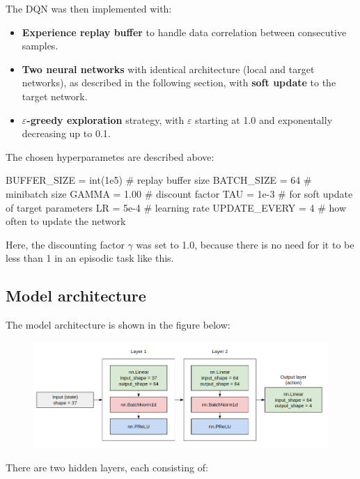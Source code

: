\documentclass{article}
\begin{document}
The DQN was then implemented with:

\begin{itemize}
    \item \textbf{Experience replay buffer} to handle data correlation between consecutive samples.
    \item \textbf{Two neural networks} with identical architecture (local and target networks), as described in the following section, with \textbf{soft update} to the target network.
    \item \textbf{$\varepsilon$-greedy exploration} strategy, with $\varepsilon$ starting at 1.0 and exponentally decreasing up to 0.1.
\end{itemize}

The chosen hyperparametes are described above:

\begin{code}[Python]
BUFFER_SIZE = int(1e5)  # replay buffer size
BATCH_SIZE = 64         # minibatch size
GAMMA = 1.00            # discount factor
TAU = 1e-3              # for soft update of target parameters
LR = 5e-4               # learning rate
UPDATE_EVERY = 4        # how often to update the network
\end{code}

Here, the discounting factor $\gamma$ was set to 1.0, because there is no need for it to be less than 1 in an episodic task like this.

\subsection{Model architecture}

The model architecture is shown in the figure below:

\begin{figure}[H]
\centering
\includegraphics[scale=0.45]{img/model_arch.png}
\label{fig:model_arch}
\end{figure}

There are two hidden layers, each consisting of:
\end{document}
